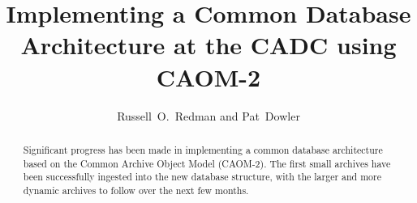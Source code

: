 
\resetcounters




\title{Implementing a Common Database Architecture at the CADC using CAOM-2}
\author{Russell~O.~Redman and Pat~Dowler}


\begin{abstract}
Significant progress has been made in implementing a common database architecture based on the Common Archive Object Model (CAOM-2). The first small archives have been successfully ingested into the new database structure, with the larger and more dynamic archives to follow over the next few months. 
\end{abstract}

